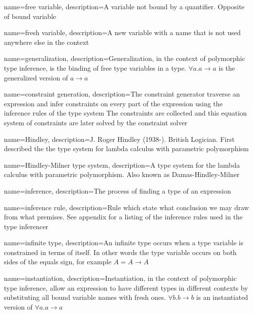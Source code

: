 { name={free variable},
  description={A variable not bound by a quantifier. Opposite of bound variable}
}

{ name={fresh variable},
  description={A new variable with a name that is not used anywhere else in the context}
}

{ name={generalization},
  description={Generalization, in the context of polymorphic type inference, is the binding of free type variables in a type. $\forall a . a \to a$ is the generalized version of $a \to a$}
}

{ name={constraint generation},
  description={The constraint generator traverse an expression and infer constraints on every part of the expression using the inference rules of the type system The constraints are collected and this equation system of constraints are later solved by the constraint solver}
}

{ name={Hindley},
  description={J. Roger Hindley (1938-). British Logician. First described the the type system for lambda calculus with parametric polymorphism}
} %

{ name={Hindley-Milner type system},
  description={A type system for the lambda calculus with parametric polymorphism. Also known as Damas-Hindley-Milner}
}

{ name={inference},
  description={The process of finding a type of an expression}
}

{ name={inference rule},
  description={Rule which state what conclusion we may draw from what premises. See appendix for a listing of the inference rules used in the type inferencer}
}

{ name={infinite type},
  description={An infinite type occurs when a type variable is constrained in terms of itself. In other words the type variable occurs on both sides of the equals sign, for example $A = A \to A$}
}

{ name={instantiation},
  description={Instantiation, in the context of polymorphic type inference, allow an expression to have different types in different contexts by substituting all bound variable names with fresh ones. $\forall b . b \to b$ is an instantiated version of $\forall a . a \to a$}
}

